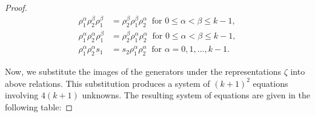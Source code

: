 \documentclass[preprint]{elsarticle}
\begin{document}
\begin{proof}
\begin{align*}
    \rho_1^{\alpha} \rho_{2}^{\beta} \rho_1^{\beta} &= \rho_{2}^{\beta} \rho_1^{\beta} \rho_{2}^{\alpha} \ \text{ for } 0 \leq \alpha < \beta \leq k-1,   \\
    \rho_1^{\alpha} \rho_{2}^{\alpha} \rho_1^{\beta} &= \rho_{2}^{\beta} \rho_1^{\alpha} \rho_{2}^{\alpha} \  \text{ for } 
    0 \leq \alpha < \beta \leq k-1, \\
     \rho_1^{\alpha} \rho_{2}^{\alpha} s_1 &= s_{2} \rho_1^{\alpha} \rho_{2}^{\alpha} \ \text{ for } \alpha=0,1,\dots,k-1.
\end{align*}

Now, we substitute the images of the generators under the representations $\zeta$ into above relations. This substitution produces a system of $(k+1)^2$ equations involving $4(k+1)$ unknowns. The resulting system of equations are given in the following table:

\end{proof}
\end{document}
